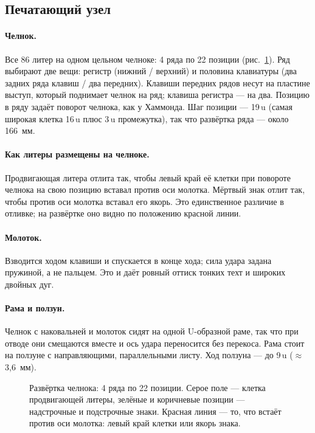 \subsection{Печатающий узел}

\paragraph{Челнок.} Все 86 литер на одном цельном челноке: 4 ряда по 22 позиции (рис.~\ref{fig:shuttle}). Ряд выбирают две вещи: регистр (нижний / верхний) и половина клавиатуры (два задних ряда клавиш / два передних). Клавиши передних рядов несут на пластине выступ, который поднимает челнок на ряд; клавиша регистра — на два. Позицию в ряду задаёт поворот челнока, как у Хаммонда. Шаг позиции — 19\,u (самая широкая клетка 16\,u плюс 3\,u промежутка), так что развёртка ряда — около 166~мм.

\paragraph{Как литеры размещены на челноке.} Продвигающая литера отлита так, чтобы левый край её клетки при повороте челнока на свою позицию вставал против оси молотка. Мёртвый знак отлит так, чтобы против оси молотка вставал его якорь. Это единственное различие в отливке; на развёртке оно видно по положению красной линии.

\paragraph{Молоток.} Взводится ходом клавиши и спускается в конце хода; сила удара задана пружиной, а не пальцем. Это и даёт ровный оттиск тонких техт и широких двойных дуг.

\paragraph{Рама и ползун.} Челнок с наковальней и молоток сидят на одной U-образной раме, так что при отводе они смещаются вместе и ось удара переносится без перекоса. Рама стоит на ползуне с направляющими, параллельными листу. Ход ползуна — до 9\,u ($\approx$ 3,6~мм).

\begin{figure}[h]
\centering
\setlength\tgem{6.2mm}
\begin{tikzpicture}[x=\tgu,y=\tgu]

\end{tikzpicture}
\caption{Развёртка челнока: 4 ряда по 22 позиции. Серое поле — клетка продвигающей литеры, зелёные и коричневые позиции — надстрочные и подстрочные знаки. Красная линия — то, что встаёт против оси молотка: левый край клетки или якорь знака.}
\label{fig:shuttle}
\end{figure}

